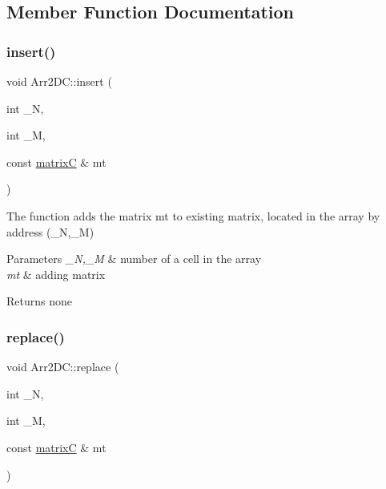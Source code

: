 \subsection{Member Function Documentation}
\mbox{\label{class_arr2_d_c_a1d194f079eb8127bcbe0b4c22779ec3e}} 
\subsubsection{\texorpdfstring{insert()}{insert()}}
{\footnotesize\ttfamily void Arr2\+D\+C\+::insert (\begin{DoxyParamCaption}\item[{int}]{\+\_\+N,  }\item[{int}]{\+\_\+M,  }\item[{const \mbox{\hyperlink{classmatrix_c}{matrixC}} \&}]{mt }\end{DoxyParamCaption})}



The function adds the matrix mt to existing matrix, located in the array by address (\+\_\+N,\+\_\+M) 


\begin{DoxyParams}{Parameters}
{\em \+\_\+N,\+\_\+M} & number of a cell in the array \\
\hline
{\em mt} & adding matrix \\
\hline
\end{DoxyParams}
\begin{DoxyReturn}{Returns}
none 
\end{DoxyReturn}
\mbox{\label{class_arr2_d_c_ac2aaaee7f4c38e61f1344565cc41d7f0}} 
\subsubsection{\texorpdfstring{replace()}{replace()}}
{\footnotesize\ttfamily void Arr2\+D\+C\+::replace (\begin{DoxyParamCaption}\item[{int}]{\+\_\+N,  }\item[{int}]{\+\_\+M,  }\item[{const \mbox{\hyperlink{classmatrix_c}{matrixC}} \&}]{mt }\end{DoxyParamCaption})}



